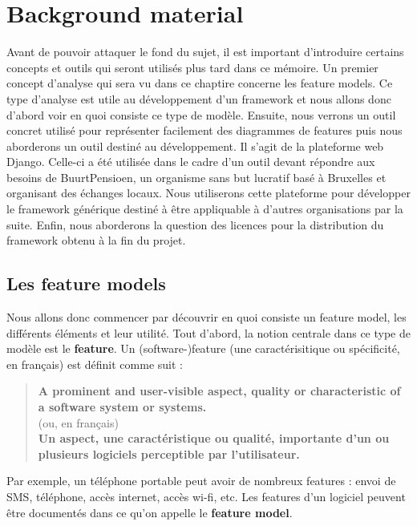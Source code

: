 \section{Background material}

Avant de pouvoir attaquer le fond du sujet,  il est important d'introduire certains concepts et outils qui seront utilisés plus tard dans ce mémoire.  Un premier concept d'analyse qui sera vu dans ce chaptire concerne les feature models.  Ce type d'analyse est utile au développement d'un framework et nous allons donc d'abord voir en quoi consiste ce type de modèle.  Ensuite,  nous verrons un outil concret utilisé pour représenter facilement des diagrammes de features puis nous aborderons un outil destiné au développement.  Il s'agit de la plateforme web Django.  Celle-ci a été utilisée dans le cadre d'un outil devant répondre aux besoins de BuurtPensioen,  un organisme sans but lucratif basé à Bruxelles et organisant des échanges locaux.  Nous utiliserons cette plateforme pour développer le framework générique destiné à être appliquable à d'autres organisations par la suite.  Enfin,  nous aborderons la question des licences pour la distribution du framework obtenu à la fin du projet.

\subsection{Les feature models}
\label{featuremodel}

Nous allons donc commencer par découvrir en quoi consiste un feature model,  les différents éléments et leur utilité.  Tout d'abord,  la notion centrale dans ce type de modèle est le \textbf{feature}.  Un (software-)feature (une caractérisitique ou spécificité,  en français) est définit comme suit :

\begin{framed} \begin{quote}
\textbf{A prominent and user-visible aspect,  quality or characteristic of a software system or systems.} \cite{GenProg}\\
(ou,  en français) \\
\textbf{Un aspect,  une caractéristique ou qualité,  importante d'un ou plusieurs logiciels perceptible par l'utilisateur.}
\end{quote} \end{framed}

Par exemple,  un téléphone portable peut avoir de nombreux features :  envoi de SMS,  téléphone,  accès internet,  accès wi-fi,  etc.  
Les features d'un logiciel peuvent être documentés dans ce qu'on appelle le \textbf{feature model}.  

